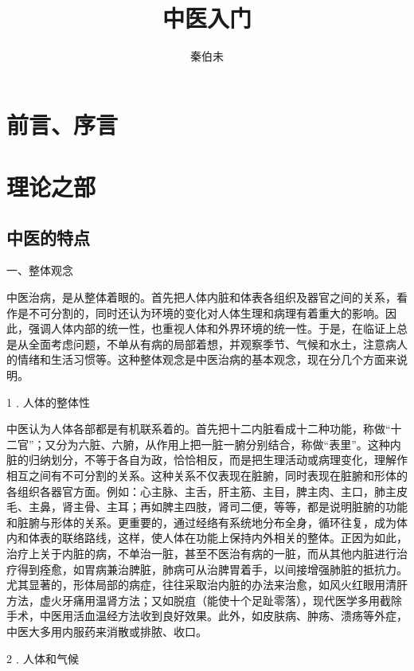 \documentclass[12pt,UTF8]{ctexbook}
\title{\heiti\zihao{0} 中医入门}
\author{秦伯未}
\date{}
\begin{document}
\maketitle
\tableofcontents

\frontmatter
\chapter{前言、序言}



\mainmatter

\chapter{理论之部}

\section{中医的特点}

一、整体观念

中医治病，是从整体着眼的。首先把人体内脏和体表各组织及器官之间的关系，看作是不可分割的，同时还认为环境的变化对人体生理和病理有着重大的影响。因此，强调人体内部的统一性，也重视人体和外界环境的统一性。于是，在临证上总是从全面考虑问题，不单从有病的局部着想，并观察季节、气候和水土，注意病人的情绪和生活习惯等。这种整体观念是中医治病的基本观念，现在分几个方面来说明。

1﹒人体的整体性

中医认为人体各部都是有机联系着的。首先把十二内脏看成十二种功能，称做“十二官”；又分为六脏、六腑，从作用上把一脏一腑分别结合，称做“表里”。这种内脏的归纳划分，不等于各自为政，恰恰相反，而是把生理活动或病理变化，理解作相互之间有不可分割的关系。这种关系不仅表现在脏腑，同时表现在脏腑和形体的各组织各器官方面。例如：心主脉、主舌，肝主筋、主目，脾主肉、主口，肺主皮毛、主鼻，肾主骨、主耳；再如脾主四肢，肾司二便，等等，都是说明脏腑的功能和脏腑与形体的关系。更重要的，通过经络有系统地分布全身，循环往复，成为体内和体表的联络路线，这样，使人体在功能上保持内外相关的整体。正因为如此，治疗上关于内脏的病，不单治一脏，甚至不医治有病的一脏，而从其他内脏进行治疗得到痊愈，如胃病兼治脾脏，肺病可从治脾胃着手，以间接增强肺脏的抵抗力。尤其显著的，形体局部的病症，往往采取治内脏的办法来治愈，如风火红眼用清肝方法，虚火牙痛用温肾方法；又如脱疽（能使十个足趾零落），现代医学多用截除手术，中医用活血温经方法收到良好效果。此外，如皮肤病、肿疡、溃疡等外症，中医大多用内服药来消散或排脓、收口。

2﹒人体和气候
\end{document}
